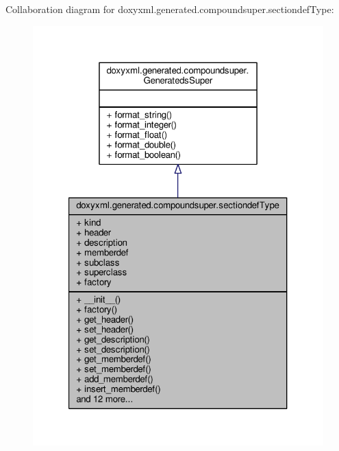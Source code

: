 Collaboration diagram for doxyxml.\+generated.\+compoundsuper.\+sectiondef\+Type\+:
\nopagebreak
\begin{figure}[H]
\begin{center}
\leavevmode
\includegraphics[width=321pt]{d4/ddd/classdoxyxml_1_1generated_1_1compoundsuper_1_1sectiondefType__coll__graph}
\end{center}
\end{figure}
